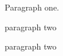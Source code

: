 \documentclass{article}
\begin{document}
Paragraph one.

paragraph two

\newpage

paragraph two
\end{document}
